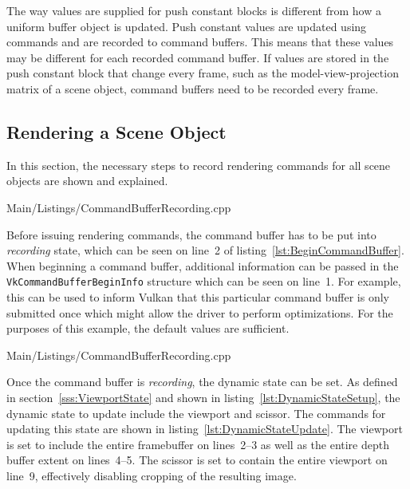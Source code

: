     The way values are supplied for push constant blocks is different from how a uniform buffer object is updated.
    Push constant values are updated using commands and are recorded to command buffers.
    This means that these values may be different for each recorded command buffer.
    If values are stored in the push constant block that change every frame, such as the model-view-projection matrix of a scene object, command buffers need to be recorded every frame.

    \subsection{Rendering a Scene Object}
      In this section, the necessary steps to record rendering commands for all scene objects are shown and explained.

      
      {Main/Listings/CommandBufferRecording.cpp}

      Before issuing rendering commands, the command buffer has to be put into \textit{recording} state, which can be seen on line~2 of listing~\ref{lst:BeginCommandBuffer}.
      When beginning a command buffer, additional information can be passed in the \lstinline{VkCommandBufferBeginInfo} structure which can be seen on line~1.
      For example, this can be used to inform Vulkan that this particular command buffer is only submitted once which might allow the \gls{driver} to perform optimizations.
      For the purposes of this example, the default values are sufficient.

      
      {Main/Listings/CommandBufferRecording.cpp}

      Once the command buffer is \textit{recording}, the dynamic state can be set.
      As defined in section~\ref{sss:ViewportState} and shown in listing~\ref{lst:DynamicStateSetup}, the dynamic state to update include the viewport and scissor.
      The commands for updating this state are shown in listing~\ref{lst:DynamicStateUpdate}.
      The viewport is set to include the entire framebuffer on lines~2--3 as well as the entire depth buffer extent on lines~4--5.
      The scissor is set to contain the entire viewport on line~9, effectively disabling cropping of the resulting image.


